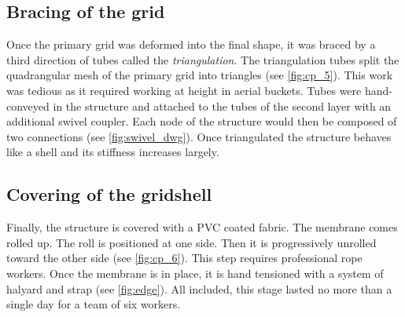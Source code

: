 \subsection{Bracing of the grid}
Once the primary grid was deformed into the final shape, it was braced by a third direction of tubes called the \emph{triangulation}. The triangulation tubes split the quadrangular mesh of the primary grid into triangles (see \cref{fig:cp_5}). This work was tedious as it required working at height in aerial buckets. Tubes were hand-conveyed in the structure and attached to the tubes of the second layer with an additional swivel coupler. Each node of the structure would then be composed of two connections (see \cref{fig:swivel_dwg}). Once triangulated the structure behaves like a shell and its stiffness increases largely.


\subsection{Covering of the gridshell}
Finally, the structure is covered with a PVC coated fabric. The membrane comes rolled up. The roll is positioned at one side. Then it is progressively unrolled toward the other side (see \cref{fig:cp_6}). This step requires professional rope workers. Once the membrane is in place, it is hand tensioned with a system of halyard and strap (see \cref{fig:edge}). All included, this stage lasted no more than a single day for a team of six workers.

